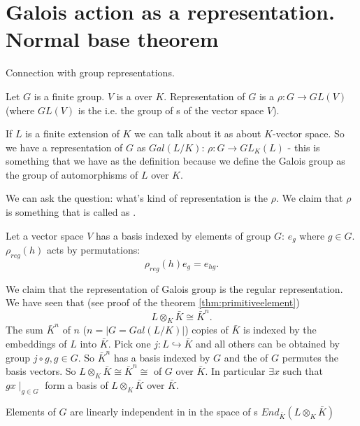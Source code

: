 \section{Galois action as a representation. Normal base theorem}

Connection with group representations.
\begin{definition}
  Let $G$ is a finite group. $V$ is a  over
  $K$. Representation of $G$ is a 
  $\rho: G \to GL\left(V\right)$
  (where $GL\left(V\right)$ is the  i.e. the group of
  s of the vector space $V$).
  \label{def:grouprepresentation}
\end{definition}

If $L$ is a finite extension of $K$ we can talk about it as about
$K$-vector space. So we have a representation of $G$ as
 $Gal\left(L/K\right)$:
$\rho: G \to GL_K\left(L\right)$ - this is something that we have as
the definition because we define the Galois group as the group of
automorphisms of $L$ over $K$.

We can ask the question: what's kind of representation is the
$\rho$. We claim that $\rho$ is something that is called as
.
\begin{definition}
  Let a vector space $V$ has a basis indexed by elements of group $G$:
  $e_g$ where $g \in G$. $\rho_{reg}\left(h\right)$ acts by
  permutations:
  \[
  \rho_{reg}\left(h\right) e_g = e_{hg}.
  \]
  \label{def:regularrepresentation}
\end{definition}

We claim that the representation of Galois group is the regular
representation. We have seen that (see proof of the theorem
\ref{thm:primitiveelement}) 
\[
L \otimes_K \bar{K} \cong \bar{K}^n.
\]
The sum $\bar{K}^n$ of $n$ ($n = \left|G = Gal\left(L/K\right)\right|$)
copies of $\bar{K}$ is indexed by the embeddings of $L$ into
$\bar{K}$. Pick one $j: L \hookrightarrow \bar{K}$ and all others can
be obtained by group  $j \circ g, g \in G$. So
$\bar{K}^n$ has a basis indexed by $G$ and the  of
$G$ permutes the basis vectors. So $L \otimes_K \bar{K} \cong
\bar{K}^n \cong$  of $G$ over
$\bar{K}$. In particular $\exists x$ such that $gx \mid_{g \in G}$
form a basis of $L \otimes_K \bar{K}$ over $\bar{K}$.

Elements of $G$ are linearly independent in in the space of
s
$End_{\bar{K}}\left(L \otimes_K \bar{K}\right)$

